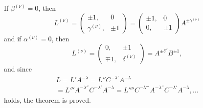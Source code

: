 If $\beta^{(\nu)} = 0$, then
\[
L^{(\nu)} = \begin{pmatrix}\pm 1, & 0\\\gamma^{(\nu)}, & \pm 1\end{pmatrix} = \begin{pmatrix}\pm 1, & 0\\0, & \pm 1\end{pmatrix} A^{\pm\gamma^{(\nu)}}
\]
and if $\alpha^{(\nu)} = 0$, then
\[
L^{(\nu)} = \begin{pmatrix}0, & \pm 1\\\mp 1, & \delta^{(\nu)}\end{pmatrix} = A^{\pm\delta^\nu} B^{\pm 1},
\]
and since
\[
\begin{gathered}
L = L'A^{-\lambda} = L''C^{-\lambda'}A^{-\lambda}\\
= L'''A^{-\lambda''}C^{-\lambda'}A^{-\lambda} = L''''C^{-\lambda'''}A^{-\lambda''}C^{-\lambda'}A^{-\lambda}, \dots
\end{gathered}
\]
holds, the theorem is proved.

